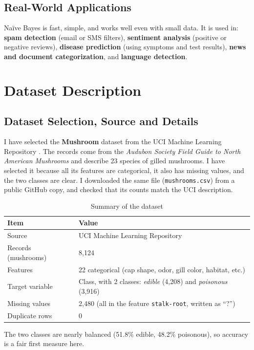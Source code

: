 \documentclass[12pt,a4paper]{article}
\begin{document}
\subsection{Real-World Applications}
Na\"ive Bayes is fast, simple, and works well even with small data. It is used in: \textbf{spam detection} (email or SMS filters), \textbf{sentiment analysis} (positive or negative reviews), \textbf{disease prediction} (using symptoms and test results), \textbf{news and document categorization}, and \textbf{language detection}.

\section{Dataset Description}

\subsection{Dataset Selection, Source and Details}
I have selected the \textbf{Mushroom} dataset from the UCI Machine Learning Repository \cite{schlimmer1987}. The records come from the \emph{Audubon Society Field Guide to North American Mushrooms} and describe 23 species of gilled mushrooms. I have selected it because all its features are categorical, it also has missing values, and the two classes are clear. I downloaded the same file (\texttt{mushrooms.csv}) from a public GitHub copy, and checked that its counts match the UCI description.

\begin{table}[H]
\centering
\caption{Summary of the dataset}
\begin{tabular}{ll}
\toprule
\textbf{Item} & \textbf{Value}\\
\midrule
Source & UCI Machine Learning Repository\\
Records (mushrooms) & 8,124\\
Features & 22 categorical (cap shape, odor, gill color, habitat, etc.)\\
Target variable & Class, with 2 classes: \emph{edible} (4,208) and \emph{poisonous} (3,916)\\
Missing values & 2,480 (all in the feature \texttt{stalk-root}, written as ``?'')\\
Duplicate rows & 0\\
\bottomrule
\end{tabular}
\end{table}

The two classes are nearly balanced (51.8\% edible, 48.2\% poisonous), so accuracy is a fair first measure here.
\end{document}

